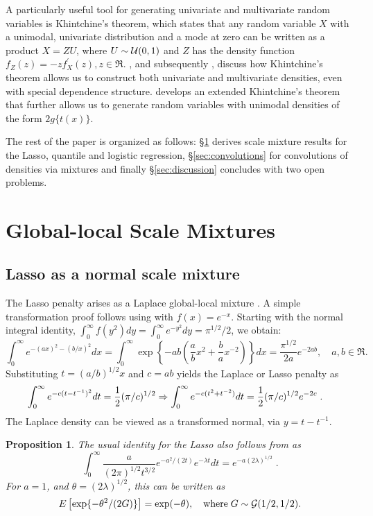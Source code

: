 \documentclass[bj]{imsart}
\newtheorem{proposition}[theorem]{Proposition}
\begin{document}
A particularly useful tool for generating univariate and multivariate random variables is Khintchine's theorem, which states that any random variable $X$ with a unimodal, univariate distribution and a mode at zero can be written as a product $X = Z U$, where $U \sim \mathcal{U}(0,1)$ and $Z$ has the density function $f_Z(z) = -z f^{\prime}_{X}(z), z \in \Re$. \citet{bryson1982constructing}, and subsequently \citet{jones2012khintchine}, discuss how Khintchine's theorem allows us to construct both univariate and multivariate densities, even with special dependence structure. \citet{jones_generating_2014} develops an extended Khintchine's theorem that further allows us to generate random variables with unimodal densities of the form $2 g\{t(x)\}$. 

The rest of the paper is organized as follows: \S\ref{sec:gls_mixes} derives scale mixture results for the Lasso, quantile and logistic regression, \S\ref{sec:convolutions} for convolutions of densities via mixtures and finally \S\ref{sec:discussion} concludes with two open problems.

\section{Global-local Scale Mixtures}
\label{sec:gls_mixes}
\subsection{Lasso as a normal scale mixture}

The Lasso penalty arises as a Laplace global-local mixture \citep{andrews_scale_1974}.  A simple transformation proof follows using \CS{} with $f(x) = e^{-x}$.  Starting with the normal integral identity, $\int_{0}^{\infty} f(y^2) dy = \int_0^\infty e^{-y^2} dy = \pi^{1/2}/2 $, we obtain:
\[
\int_0^\infty e^{-(a x)^2 - (b/x)^2} d x = \int_0^{\infty}\exp\left\{-a b \left(\frac{a}{b} x^2 + \frac{b}{a} x^{-2} \right)\right\} dx = \frac{\pi^{1/2}}{2a} e^{-2 a b}, \quad a,b \in \Re.
\]
Substituting $t = (a/b)^{1/2} x$ and $c = ab$ yields the Laplace or Lasso penalty as
\begin{align*}
  \int_0^\infty e^{- c (t - t^{-1})^2} dt &= \frac{1}{2} (\pi/c)^{1/2} \Rightarrow \int_0^\infty e^{- c (t^2 + t^{-2})} dt  = \frac{1}{2} (\pi/c)^{1/2} e^{-2c}\;. 
\end{align*}
The Laplace density can be viewed as a transformed normal, via $y = t - t^{-1}$.

\begin{proposition}
The usual identity for the Lasso also follows from \citet{levy1940certains} as
\begin{equation}
  \int_{0}^{\infty} \frac{a}{(2 \pi)^{1/2} t^{3/2}} e^{-{a^2}/({2 t})} e^{-\lambda t} dt = e^{-a (2 \lambda)^{1/2} } \;.\label{eq:levy}
\end{equation}
For $a = 1$, and $\theta = (2 \lambda)^{1/2}$, this can be written as 
\begin{equation}
  E \left[ \exp\{-\theta^2/(2G)\} \right] = \exp(-\theta),\quad \mbox{where} \; G \sim \mathcal{G}(1/2, 1/2).
  \label{eq:gamma}
\end{equation}
\end{proposition}
\end{document}
